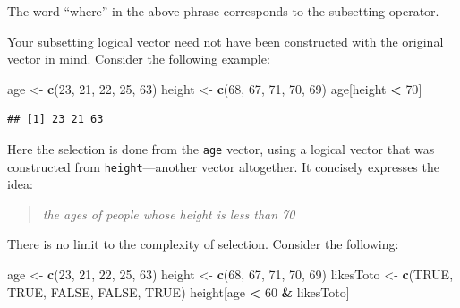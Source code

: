 \documentclass[]{book}
\makeatletter
\newenvironment{Shaded}{\begin{snugshade}}{\end{snugshade}}
\newcommand{\KeywordTok}[1]{\textcolor[rgb]{0.13,0.29,0.53}{\textbf{#1}}}
\newcommand{\DecValTok}[1]{\textcolor[rgb]{0.00,0.00,0.81}{#1}}
\newcommand{\StringTok}[1]{\textcolor[rgb]{0.31,0.60,0.02}{#1}}
\newcommand{\OtherTok}[1]{\textcolor[rgb]{0.56,0.35,0.01}{#1}}
\newcommand{\OperatorTok}[1]{\textcolor[rgb]{0.81,0.36,0.00}{\textbf{#1}}}
\newcommand{\NormalTok}[1]{#1}
\newenvironment{kframe}{%
\medskip{}
\setlength{\fboxsep}{.8em}
 \def\at@end@of@kframe{}%
 \ifinner\ifhmode%
  \def\at@end@of@kframe{\end{minipage}}%
  \begin{minipage}{\columnwidth}%
 \fi\fi%
 \def\FrameCommand##1{\hskip\@totalleftmargin \hskip-\fboxsep
 \colorbox{shadecolor}{##1}\hskip-\fboxsep
     \hskip-\linewidth \hskip-\@totalleftmargin \hskip\columnwidth}%
 \MakeFramed {\advance\hsize-\width
   \@totalleftmargin\z@ \linewidth\hsize
   \@setminipage}}%
 {\par\unskip\endMakeFramed%
 \at@end@of@kframe}
\renewenvironment{Shaded}{\begin{kframe}}{\end{kframe}}
\theoremstyle{definition}
\theoremstyle{definition}
\theoremstyle{definition}
\theoremstyle{remark}
\makeatother
\begin{document}
The word ``where'' in the above phrase corresponds to the subsetting
operator.

Your subsetting logical vector need not have been constructed with the
original vector in mind. Consider the following example:

\begin{Shaded}
\begin{Highlighting}[]
\NormalTok{age <-}\StringTok{ }\KeywordTok{c}\NormalTok{(}\DecValTok{23}\NormalTok{, }\DecValTok{21}\NormalTok{, }\DecValTok{22}\NormalTok{, }\DecValTok{25}\NormalTok{, }\DecValTok{63}\NormalTok{)}
\NormalTok{height <-}\StringTok{ }\KeywordTok{c}\NormalTok{(}\DecValTok{68}\NormalTok{, }\DecValTok{67}\NormalTok{, }\DecValTok{71}\NormalTok{, }\DecValTok{70}\NormalTok{, }\DecValTok{69}\NormalTok{)}
\NormalTok{age[height }\OperatorTok{<}\StringTok{ }\DecValTok{70}\NormalTok{]}
\end{Highlighting}
\end{Shaded}

\begin{verbatim}
## [1] 23 21 63
\end{verbatim}

Here the selection is done from the \texttt{age} vector, using a logical
vector that was constructed from \texttt{height}---another vector
altogether. It concisely expresses the idea:

\begin{quote}
\emph{the ages of people whose height is less than 70}
\end{quote}

There is no limit to the complexity of selection. Consider the
following:

\begin{Shaded}
\begin{Highlighting}[]
\NormalTok{age <-}\StringTok{ }\KeywordTok{c}\NormalTok{(}\DecValTok{23}\NormalTok{, }\DecValTok{21}\NormalTok{, }\DecValTok{22}\NormalTok{, }\DecValTok{25}\NormalTok{, }\DecValTok{63}\NormalTok{)}
\NormalTok{height <-}\StringTok{ }\KeywordTok{c}\NormalTok{(}\DecValTok{68}\NormalTok{, }\DecValTok{67}\NormalTok{, }\DecValTok{71}\NormalTok{, }\DecValTok{70}\NormalTok{, }\DecValTok{69}\NormalTok{)}
\NormalTok{likesToto <-}\StringTok{ }\KeywordTok{c}\NormalTok{(}\OtherTok{TRUE}\NormalTok{, }\OtherTok{TRUE}\NormalTok{, }\OtherTok{FALSE}\NormalTok{, }\OtherTok{FALSE}\NormalTok{, }\OtherTok{TRUE}\NormalTok{)}
\NormalTok{height[age }\OperatorTok{<}\StringTok{ }\DecValTok{60} \OperatorTok{&}\StringTok{ }\NormalTok{likesToto]}
\end{Highlighting}
\end{Shaded}
\end{document}
